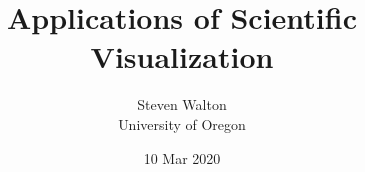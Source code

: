 \documentclass[pdf,11pt]{beamer}
\title{Applications of Scientific Visualization
}
\author{Steven Walton\\ \small University of Oregon}
\date{10 Mar 2020}
\begin{document}
\frame{\titlepage}





\end{document}
